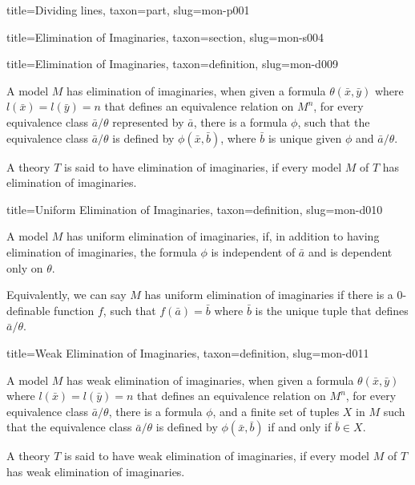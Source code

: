 \documentclass[a4paper]{article}
\begin{document}
\begin{tree}{title={Dividing lines}, taxon={part}, slug={mon-p001}}
\begin{tree}{title={Elimination of Imaginaries}, taxon={section}, slug={mon-s004}}
\begin{tree}{title={Elimination of Imaginaries}, taxon={definition}, slug={mon-d009}}

    A model \(M\) has elimination of imaginaries, when given a formula \(\theta ( \bar {x}, \bar {y})\) where \(l( \bar {x})=l( \bar {y})=n\) that defines an equivalence relation on \(M^n\), for every equivalence class \(\bar {a}/ \theta\) represented by \(\bar {a}\), there is a formula \(\phi\), such that the equivalence class \(\bar {a}/ \theta\) is defined by \(\phi ( \bar {x}, \bar {b})\), where \(\bar {b}\) is unique given \(\phi\) and \(\bar {a}/ \theta\).

    A theory \(T\) is said to have elimination of imaginaries, if every model \(M\) of \(T\) has elimination of imaginaries.

\end{tree}

\begin{tree}{title={Uniform Elimination of Imaginaries}, taxon={definition}, slug={mon-d010}}

    A model \(M\) has uniform elimination of imaginaries, if, in addition to having elimination of imaginaries, the formula \(\phi\) is independent of \(\bar {a}\) and is dependent only on \(\theta\). 
    
    Equivalently, we can say $M$ has uniform elimination of imaginaries if there is a $0$-definable function \(f\), such that \(f( \bar {a})= \bar {b}\) where \(\bar {b}\) is the unique tuple that defines \(\bar {a}/ \theta\).

\end{tree}

\begin{tree}{title={Weak Elimination of Imaginaries}, taxon={definition}, slug={mon-d011}}
  
    A model \(M\) has weak elimination of imaginaries, when given a formula \(\theta ( \bar {x}, \bar {y})\) where \(l( \bar {x})=l( \bar {y})=n\) that defines an equivalence relation on \(M^n\), for every equivalence class \(\bar {a}/ \theta\), there is a formula \(\phi\), and a finite set of tuples \(X\) in \(M\) such that the equivalence class \(\bar {a}/ \theta\) is defined by \(\phi ( \bar {x}, \bar {b})\) if and only if \(\bar {b} \in  X\).
    
    A theory \(T\) is said to have weak elimination of imaginaries, if every model \(M\) of \(T\) has weak elimination of imaginaries.

\end{tree}

\end{tree}


\end{tree}
\end{document}
